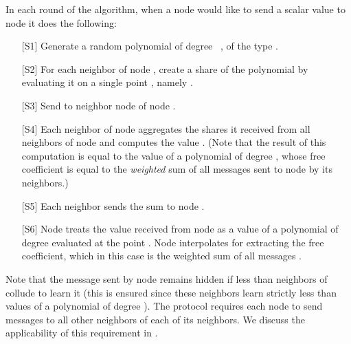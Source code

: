 \documentclass[10pt]{svjour3}
\begin{document}
In each round of the algorithm, when a node  would like to send
a scalar value  to node  it does the following:
\begin{itemize}
    \item [{[S1]}]  Generate a random polynomial  of degree
   ~, of the type \/ .
    \item [{[S2]}] For each neighbor  of node , create a share  of
    the polynomial  by evaluating it on a single point
    , namely .
\item [{[S3]}] Send  to neighbor node  of node .
    \item [{[S4]}] Each neighbor  of node  aggregates the
      shares it received from all neighbors of node   and computes the value
 . (Note
 that the result of this computation is equal to the value of a polynomial of degree ,
 whose free coefficient is equal to the {\em weighted} sum of all messages sent to
 node  by its neighbors.)
    \item [{[S5]}] Each neighbor  sends the sum  to node .

    \item [{[S6]}]
    Node  treats the value received from node  as a
      value of a polynomial of degree  evaluated at the point
      . Node  interpolates  for extracting the
    free coefficient, which in this case is the weighted sum of all
    messages .
\end{itemize}




Note that the message  sent by node  remains hidden
if less than   neighbors of  collude to learn
it (this is ensured since these neighbors learn strictly less than  values
of a polynomial of degree ).
The protocol requires each node  to send messages to
all other
neighbors of each of its neighbors. We discuss the applicability of this requirement in
.

\end{document}
